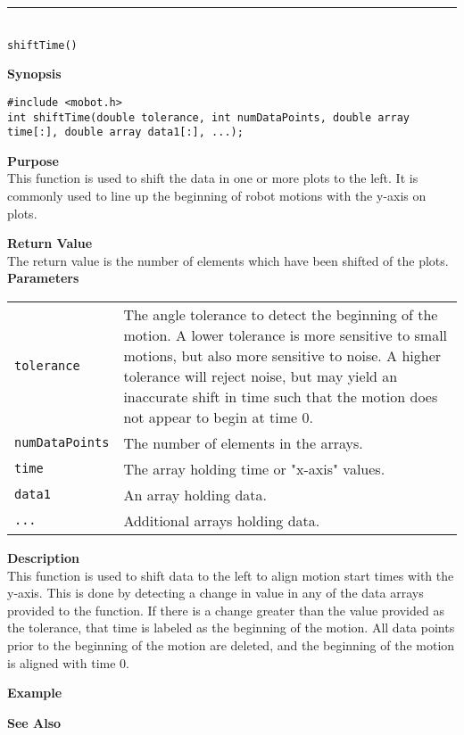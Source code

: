 \noindent
\vspace{5pt}
\rule{4.5in}{0.015in}\\
\noindent
{\LARGE \texttt{shiftTime()}}\\
{}

\noindent
{\bf Synopsis}
\vspace{-8pt}
\begin{verbatim}
#include <mobot.h>
int shiftTime(double tolerance, int numDataPoints, double array time[:], double array data1[:], ...);
\end{verbatim}

\noindent
{\bf Purpose}\\
This function is used to shift the data in one or more plots to the left. It is commonly used to
line up the beginning of robot motions with the y-axis on plots.

\noindent
{\bf Return Value}\\
The return value is the number of elements which have been shifted of the plots. \\

\noindent
{\bf Parameters}
\vspace{-0.1in}
\begin{description}
\item               
\begin{tabular}{p{10 mm}p{145 mm}}
\texttt{tolerance} & The angle tolerance to detect the beginning of the motion. A lower tolerance
is more sensitive to small motions, but also more sensitive to noise. A higher tolerance will
reject noise, but may yield an inaccurate shift in time such that the motion does not appear to
begin at time 0. \\
\texttt{numDataPoints} & The number of elements in the arrays. \\
\texttt{time} & The array holding time or "x-axis" values. \\
\texttt{data1} & An array holding data. \\
\texttt{...} & Additional arrays holding data. 
\end{tabular}
\end{description}

\noindent
{\bf Description}\\
This function is used to shift data to the left to align motion start times with the
y-axis. This is done by detecting a change in value in any of the data arrays provided
to the function. If there is a change greater than the value provided as the
tolerance, that time is labeled as the beginning of the motion. All data points
prior to the beginning of the motion are deleted, and the beginning of the
motion is aligned with time 0.

\noindent
{\bf Example}\\
\noindent

\noindent
{\bf See Also}\\


